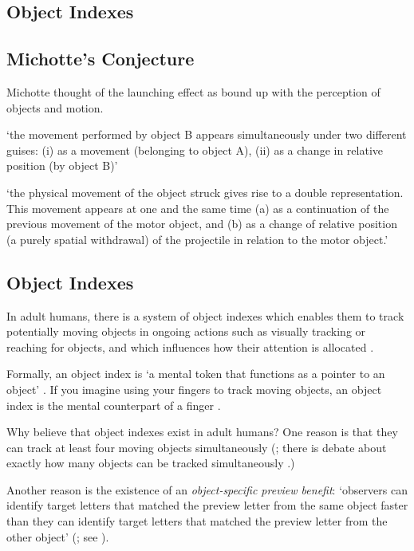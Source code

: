 \documentclass[12pt]{extarticle}
\begin{document}
\begin{multicols*}{3}
\section{Object Indexes}


\subsection{Michotte’s Conjecture}
Michotte thought of the launching effect as bound up  with the perception of 
objects and motion.

‘the movement performed by object B appears simultaneously under two
different guises: (i) as a movement (belonging to object A), (ii) as a
change in relative position (by object B)’
\citep[p.~136]{Michotte:1946nz}

‘the physical movement of the object struck gives rise to a double
representation. This movement appears at one and the same time (a) as a
continuation of the previous movement of the motor object, and (b) as a
change of relative position (a purely spatial withdrawal) of the projectile
in relation to the motor object.’
\citep[p.~140]{Michotte:1946nz}

\subsection{Object Indexes}
In adult humans,
there is a system of object indexes which enables them to track potentially moving objects in ongoing actions such as visually tracking or
reaching for objects, and which influences how their attention is allocated
\citep{flombaum:2008_attentional}.

Formally, an object index is ‘a mental token that functions as a
pointer to an object’ \citep[p.\ 11]{Leslie:1998zk}.
If you imagine using your fingers to track moving objects,
an object index is the mental counterpart of a finger \citep[p.~68]{pylyshyn:1989_role}.

Why believe that object indexes exist in adult humans?
One reason is that they can track at least four moving objects simultaneously
(\citealp{pylyshyn:1988_tracking}; there is debate about exactly how many objects can be tracked simultaneously \citep{alvarez:2007_how}.)

Another reason is the existence of an  \emph{object-specific preview benefit}: ‘observers can identify target
letters that matched the preview letter from the same object faster than
they can identify target letters that matched the preview letter from the
other object’ (\citealp[p.~2]{Krushke:1996ge}; see \citealp{Kahneman:1992xt}).


\end{multicols*}
\end{document}
